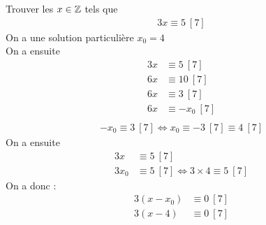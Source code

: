 \begin{exemple}
Trouver les $x \in \mathbb{Z}$ tels que 
\begin{align*}
3x \equiv 5 \ [7]
\end{align*}
On a une solution particulière $x_0 = 4$
\\
On a ensuite
\begin{align*}
3x &\equiv 5 \ [7] \\
6x &\equiv 10 \ [7] \\
6x &\equiv 3 \ [7] \\
6x &\equiv -x_0 \ [7] \\
\end{align*}
\begin{align*}
-x_0 \equiv 3 \ [7] \iff x_0 \equiv -3 \ [7] \equiv 4 \ [7]
\end{align*}
On a ensuite 
\begin{align*}
3x &\equiv 5 \ [7] \\
3x_0 &\equiv 5 \ [7] \iff 3 \times 4 \equiv 5 \ [7]
\end{align*}
On a donc :
\begin{align*}
3(x - x_0) &\equiv 0 \ [7] \\
3(x - 4) &\equiv 0 \ [7]
\end{align*}
\end{exemple}